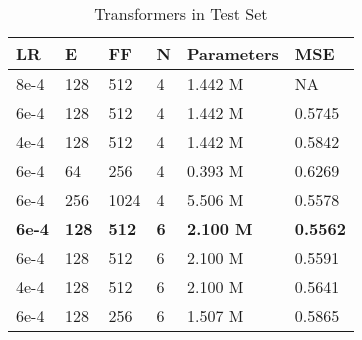 \begin{table}[ht]
\caption{Transformers in Test Set}
\label{tab:architeture}
\centering \vspace{1em}
\begin{tabular}{llllll}
\hline
LR & E    & FF &  N & Parameters       & MSE   \\
\hline
8e-4          & 128          & 512          & 4                  & 1.442 M          & NA              \\
6e-4          & 128          & 512          & 4                  & 1.442 M          & 0.5745          \\
4e-4          & 128          & 512          & 4                  & 1.442 M          & 0.5842          \\
6e-4          & 64           & 256          & 4                  & 0.393 M          & 0.6269          \\
6e-4          & 256          & 1024         & 4                  & 5.506 M          & 0.5578          \\
\textbf{6e-4} & \textbf{128} & \textbf{512} & \textbf{6}         & \textbf{2.100 M} & \textbf{0.5562} \\
6e-4          & 128          & 512          & 6                  & 2.100 M          & 0.5591          \\
4e-4          & 128          & 512          & 6                  & 2.100 M          & 0.5641          \\
6e-4          & 128          & 256          & 6                  & 1.507 M          & 0.5865       \\ 
\hline
\end{tabular}
\end{table}